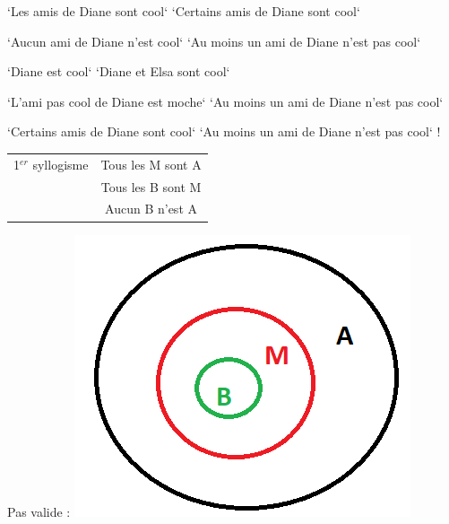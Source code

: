 \begin{frame}

`Les amis de Diane sont cool`  `Certains amis de Diane sont cool`\pause\pause\newline

`Aucun ami de Diane n'est cool`  `Au moins un ami de Diane n'est pas cool`\pause\pause\newline

`Diane est cool`  `Diane et Elsa sont cool`\pause\pause\newline

`L'ami pas cool de Diane est moche`  `Au moins un ami de Diane n'est pas cool`\pause\pause\newline

`Certains amis de Diane sont cool` `Au moins un ami de Diane n'est pas cool` ! 	
\end{frame}


\begin{frame}

\begin{tabular}{lc}
1$^{er}$ syllogisme & Tous les M sont A \\
		& Tous les B sont M \\
\cline{2-2}
		& Aucun B n'est A \\
\end{tabular}
\pause

Pas valide : \pause\newline
\includegraphics[scale=0.5]{S1DM3.png}

\end{frame}


